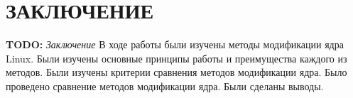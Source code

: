 \chapter*{ЗАКЛЮЧЕНИЕ}
\textbf{TODO:} \textit{Заключение}
В ходе работы были изучены методы модификации ядра Linux.
Были изучены основные принципы работы и преимущества каждого из методов.
Были изучены критерии сравнения методов модификации ядра.
Было проведено сравнение методов модификации ядра.
Были сделаны выводы.
